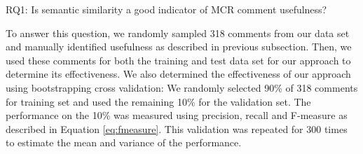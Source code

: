 %
%
%
%
%
%
%

\begin{ResearchQuestions}
\item[RQ1:] Is semantic similarity a good indicator of MCR comment usefulness?
\end{ResearchQuestions}

To answer this question, we randomly sampled 318 comments from our data set and manually identified usefulness as described in previous subsection.
Then, we used these comments for both the training and test data set for our approach to determine its effectiveness.
We also determined the effectiveness of our approach using bootstrapping cross validation:
We randomly selected 90\% of 318 comments for training set and used the remaining 10\% for the validation set.
The performance on the 10\% was measured using precision, recall and F-measure as described in Equation \ref{eq:fmeasure}.
This validation was repeated for 300 times to estimate the mean and variance of the performance.

